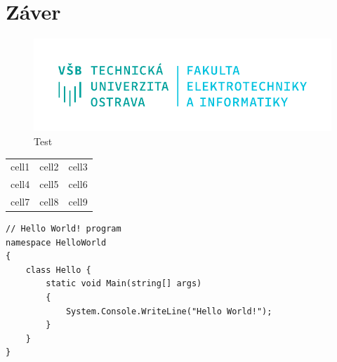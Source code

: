 \documentclass[slovak, master]{diploma}
\begin{document}
\chapter{Záver}
\label{sec:Conclusion}

\begin{figure}[!htbp]
	\centering
	\includegraphics[width=.5\textwidth]{Figures/FEI_CZ.pdf}
	\caption{Test}
	\label{pic:Teeest}
\end{figure}

\begin{center}
\begin{tabular}{ c c c }
 cell1 & cell2 & cell3 \\ 
 cell4 & cell5 & cell6 \\  
 cell7 & cell8 & cell9    
\end{tabular}
\end{center}

\begin{lstlisting}[label=src:Test,caption={Test}]
// Hello World! program
namespace HelloWorld
{
    class Hello {         
        static void Main(string[] args)
        {
            System.Console.WriteLine("Hello World!");
        }
    }
}
\end{lstlisting}

%

\printbibliography[title={Literatúra}, heading=bibintoc]
\end{document}
